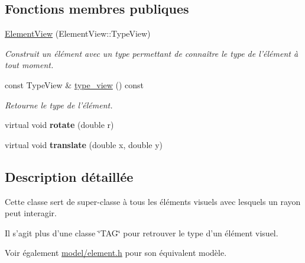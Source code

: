 \subsection*{Fonctions membres publiques}
\begin{DoxyCompactItemize}
\item 
\hypertarget{classElementView_adb918caf5a5fcc4bd945cd3cd2596f8c}{\hyperlink{classElementView_adb918caf5a5fcc4bd945cd3cd2596f8c}{Element\+View} (Element\+View\+::\+Type\+View)}\label{classElementView_adb918caf5a5fcc4bd945cd3cd2596f8c}

\begin{DoxyCompactList}\small\item\em Construit un élément avec un type permettant de connaître le type de l'élément à tout moment. \end{DoxyCompactList}\item 
const Type\+View \& \hyperlink{classElementView_a30b7a26b428be68dcc4d8f72a0f9cd0b}{type\+\_\+view} () const 
\begin{DoxyCompactList}\small\item\em Retourne le type de l'élément. \end{DoxyCompactList}\item 
\hypertarget{classElementView_a16e2c636f1eee57c3ce5c6df02273e8a}{virtual void {\bfseries rotate} (double r)}\label{classElementView_a16e2c636f1eee57c3ce5c6df02273e8a}

\item 
\hypertarget{classElementView_a5d2dffc8a3e3ea3381476bdf343fefb6}{virtual void {\bfseries translate} (double x, double y)}\label{classElementView_a5d2dffc8a3e3ea3381476bdf343fefb6}

\end{DoxyCompactItemize}


\subsection{Description détaillée}
Cette classe sert de super-\/classe à tous les éléments visuels avec lesquels un rayon peut interagir. 

Il s'agit plus d'une classe \char`\"{}\+T\+A\+G\char`\"{} pour retrouver le type d'un élément visuel. \begin{DoxySeeAlso}{Voir également}
\hyperlink{element_8h_source}{model/element.\+h} pour son équivalent modèle. 
\end{DoxySeeAlso}


